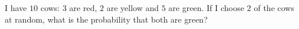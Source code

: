 I have $10$ cows: $3$ are red, $2$ are yellow and $5$ are green. If I choose $2$ of the cows at random, what is the probability that both are green?
